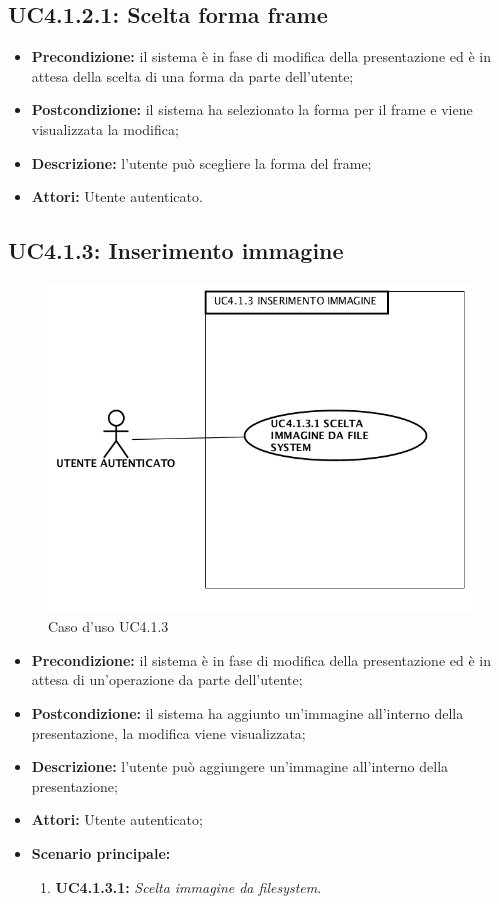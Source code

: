 \subsection{ UC4.1.2.1: Scelta forma frame}

\begin{itemize}
	\item \textbf{Precondizione:} il sistema è in fase di modifica della presentazione ed è in attesa della scelta di una forma da parte dell'utente;
	\item \textbf{Postcondizione:} il sistema ha selezionato la forma per il frame e viene visualizzata la modifica;
	\item \textbf{Descrizione:} l'utente può scegliere la forma del frame;
	\item \textbf{Attori:} Utente autenticato.
\end{itemize}
\subsection{ UC4.1.3: Inserimento immagine}

\begin{figure}[h]
	\begin{center}
	\includegraphics[scale=0.4]{diagram/UC4-1-3.png}
	\caption{Caso d'uso UC4.1.3}
	\end{center}
\end{figure}
\begin{itemize}
	\item \textbf{Precondizione:} il sistema è in fase di modifica della presentazione ed è in attesa di un'operazione da parte dell'utente;
	\item \textbf{Postcondizione:} il sistema ha aggiunto un'immagine all'interno della presentazione, la modifica viene visualizzata;
	\item \textbf{Descrizione:} l'utente può aggiungere un'immagine all'interno della presentazione;
	\item \textbf{Attori:} Utente autenticato;
	\item \textbf{Scenario principale:}
	\begin{enumerate}
		\item \textbf{ UC4.1.3.1:} \textit{ Scelta immagine da filesystem}.
	\end{enumerate}
\end{itemize}
